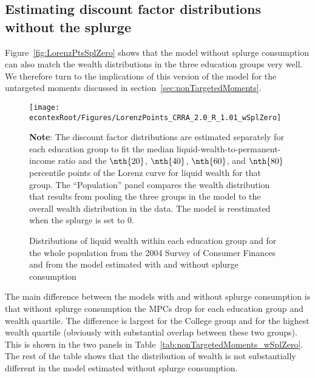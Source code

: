 \documentclass[\econtexRoot/HAFiscal]{subfiles}
\begin{document}
\subsection{Estimating discount factor distributions without the splurge}

Figure~\ref{fig:LorenzPtsSplZero} shows that the model without splurge consumption can also match the wealth distributions in the three education groups very well.
We therefore turn to the implications of this version of the model for the untargeted moments discussed in section~\ref{sec:nonTargetedMoments}.


\begin{figure}[th]
	\begin{center}
		\texttt{[image: \\econtexRoot/Figures/LorenzPoints\_CRRA\_2.0\_R\_1.01\_wSplZero]}
		\caption{Distributions of liquid wealth within each education group and for the whole population from the 2004 Survey of Consumer Finances and from the model estimated with and without splurge consumption}
		\notinsubfile{\label{fig:LorenzPtsSplZero}}
		\parbox{16cm}{\small \vspace{.15cm} \textbf{Note}: The discount factor distributions are estimated separately for each education group to fit the median liquid-wealth-to-permanent-income ratio and the $\nth{20}$, $\nth{40}$, $\nth{60}$, and $\nth{80}$ percentile points of the Lorenz curve for liquid wealth for that group. The ``Population'' panel compares the wealth distribution that results from pooling the three groups in the model to the overall wealth distribution in the data. The model is reestimated when the splurge is set to $0$.\normalsize}
		
	\end{center}
\end{figure}

The main difference between the models with and without splurge consumption is that without splurge consumption the MPCs drop for each education group and wealth quartile.
The difference is largest for the College group and for the highest wealth quartile (obviously with substantial overlap between these two groups).
This is shown in the two panels in Table~\ref{tab:nonTargetedMoments_wSplZero}.
The rest of the table shows that the distribution of wealth is not substantially different in the model estimated without splurge consumption.
\end{document}
